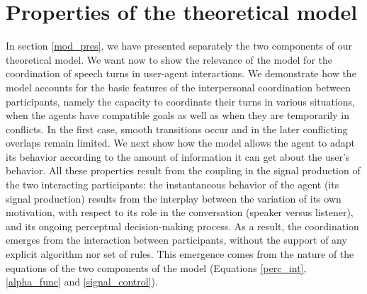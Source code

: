 \section{Properties of the theoretical model}
\label{mod_analysis}

In section \ref{mod_pres}, we have presented separately the two components of our theoretical model. 
We want now to show the relevance of the model for the coordination of speech turns in user-agent interactions.
We demonstrate how the model accounts for the basic features of the interpersonal coordination between participants, namely the capacity to coordinate their turns in various situations, when the agents have compatible goals as well as when they are temporarily in conflicts. In the first case, smooth transitions occur and in the later conflicting overlaps remain limited.
We next show how the model allows the agent to adapt its behavior according to the amount of information it can get about the user's behavior.
All these properties result from the coupling in the signal production of the two interacting participants: the instantaneous behavior of the agent (its signal production) results from the interplay between the variation of its own motivation, with respect to its role in the conversation (speaker versus listener), and its ongoing perceptual decision-making process. 
As a result, the coordination emerges from the interaction between participants, without the support of any explicit algorithm nor set of rules.
This emergence comes from the nature of the equations of the two components of the model (Equations \ref{perc_int}, \ref{alpha_func} and \ref{signal_control}). 


